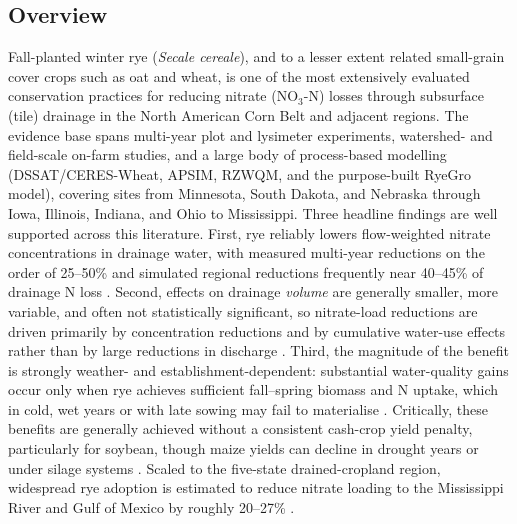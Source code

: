 \subsection{Overview}
Fall-planted winter rye (\emph{Secale cereale}), and to a lesser extent related small-grain cover crops such as oat and wheat, is one of the most extensively evaluated conservation practices for reducing nitrate (NO$_3$-N) losses through subsurface (tile) drainage in the North American Corn Belt and adjacent regions. The evidence base spans multi-year plot and lysimeter experiments, watershed- and field-scale on-farm studies, and a large body of process-based modelling (DSSAT/CERES-Wheat, APSIM, RZWQM, and the purpose-built RyeGro model), covering sites from Minnesota, South Dakota, and Nebraska through Iowa, Illinois, Indiana, and Ohio to Mississippi. Three headline findings are well supported across this literature. First, rye reliably lowers flow-weighted nitrate concentrations in drainage water, with measured multi-year reductions on the order of 25--50\% and simulated regional reductions frequently near 40--45\% of drainage N loss \parencite{Kaspar2012,Malone2018,Feyereisen2006b,Malone2014b}. Second, effects on drainage \emph{volume} are generally smaller, more variable, and often not statistically significant, so nitrate-load reductions are driven primarily by concentration reductions and by cumulative water-use effects rather than by large reductions in discharge \parencite{Kaspar2012,MartinezFeria2016,Waring2020,Qi2011b}. Third, the magnitude of the benefit is strongly weather- and establishment-dependent: substantial water-quality gains occur only when rye achieves sufficient fall--spring biomass and N uptake, which in cold, wet years or with late sowing may fail to materialise \parencite{Bawa2023,Strock2004,Feyereisen2006b,Birru2023}. Critically, these benefits are generally achieved without a consistent cash-crop yield penalty, particularly for soybean, though maize yields can decline in drought years or under silage systems \parencite{Strock2004,Qi2011b,Malone2020,MartinezFeria2016,Krueger2013}. Scaled to the five-state drained-cropland region, widespread rye adoption is estimated to reduce nitrate loading to the Mississippi River and Gulf of Mexico by roughly 20--27\% \parencite{Kladivko2014,Malone2023}.

